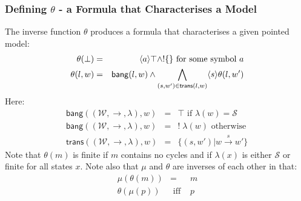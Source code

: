 \subsubsection{Defining $\theta$ - a Formula that Characterises a Model}
The inverse function $\theta$ produces a formula that characterises a given pointed model:
\begin{eqnarray}
\theta(\bot) & = & \langle a \rangle \top \land ! \{ \} \mbox{ for some symbol }a \nonumber \\
\theta(l, w) & = & \mathsf{bang}(l,w) \land \bigwedge_{(s,w') \in \mathsf{trans}(l,w)} \langle s \rangle \theta(l, w') \nonumber 
\end{eqnarray}
Here:
\begin{eqnarray}
\mathsf{bang}((\mathcal{W},\rightarrow,\lambda),w) & = & \top \mbox{ if } \lambda(w) = \mathcal{S} \nonumber \\
\mathsf{bang}((\mathcal{W},\rightarrow,\lambda),w) & = & ! \; \lambda(w) \mbox{ otherwise } \nonumber \\
\mathsf{trans}((\mathcal{W},\rightarrow, \lambda),w) & = & \{(s,w') | w \xrightarrow{s} w' \} \nonumber
\end{eqnarray}
Note that $\theta(m)$ is finite if $m$ contains no cycles and if $\lambda(x)$ is either $\mathcal{S}$ or finite for all states $x$.
Note also that $\mu$ and $\theta$ are inverses of each other in that:
\begin{eqnarray}
\mu(\theta(m)) & = & m \nonumber \\
\theta(\mu(p)) & \mbox{ iff } & p \nonumber
\end{eqnarray}


